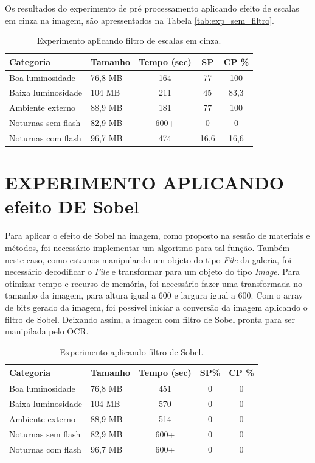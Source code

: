 Os resultados do experimento de pré processamento aplicando efeito de escalas em cinza na imagem, são apressentados na Tabela \ref{tab:exp_sem_filtro}.

\begin{table}[]
\caption{Experimento aplicando filtro de escalas em cinza.}
\label{tab:exp_grey_scale}
\centering
\begin{tabular}{llccc}
\hline
Categoria          & Tamanho    & Tempo (sec) & SP  & CP \% \\ \hline
Boa luminosidade   & 76,8 MB & 164     & 77 & 100         \\
Baixa luminosidade & 104 MB & 211     & 45 & 83,3         \\
Ambiente externo   & 88,9 MB & 181     & 77 & 100         \\
Noturnas sem flash & 82,9 MB & 600+     & 0& 0         \\
Noturnas com flash & 96,7 MB & 474     & 16,6 & 16,6         \\ \hline
\end{tabular}
	\label{fig:exp_grey_scale}
\end{table}



\section{EXPERIMENTO APLICANDO efeito DE Sobel}

Para aplicar o efeito de Sobel na imagem, como proposto na sessão de materiais e métodos, foi necessário implementar um algoritmo para tal função. Também neste caso, como estamos manipulando um objeto do tipo \textit{File} da galeria, foi necessário decodificar o \textit{File} e transformar para um objeto do tipo \textit{Image}. Para otimizar tempo e recurso de memória, foi necessário fazer uma transformada no tamanho da imagem, para altura igual a 600 e largura igual a 600. Com o array de bits gerado da imagem, foi possível iniciar a conversão da imagem aplicando o filtro de Sobel. Deixando assim, a imagem com filtro de Sobel pronta para ser manipilada pelo OCR. 

\begin{table}[]
\caption{Experimento aplicando filtro de Sobel.}
\label{tab:exp_sobel}
\centering
\begin{tabular}{llccc}
\hline
Categoria          & Tamanho    & Tempo (sec) & SP\%  & CP \% \\ \hline
Boa luminosidade   & 76,8 MB & 451     & 0 & 0         \\
Baixa luminosidade & 104 MB & 570     & 0 & 0         \\
Ambiente externo   & 88,9 MB & 514     & 0 & 0         \\
Noturnas sem flash & 82,9 MB & 600+     & 0& 0         \\
Noturnas com flash & 96,7 MB & 600+     & 0 & 0         \\ \hline
\end{tabular}
\end{table}

